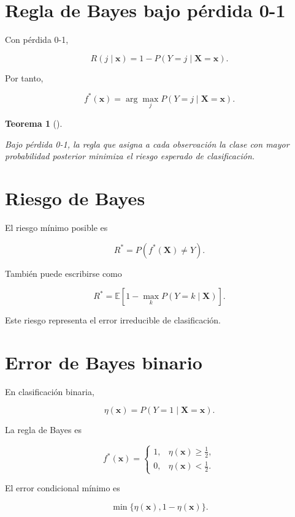 \documentclass[
  spanish,
  11pt,
  letterpaper,
  DIV=11,
  numbers=noendperiod]{scrreprt}
\theoremstyle{definition}
\theoremstyle{plain}
\newtheorem{theorem}{Teorema}[chapter]
\theoremstyle{definition}
\theoremstyle{remark}
\begin{document}
\section{Regla de Bayes bajo pérdida
0-1}\label{regla-de-bayes-bajo-puxe9rdida-0-1}

Con pérdida 0-1,

\[
R(j\mid\mathbf{x})
=
1-
P(Y=j\mid\mathbf{X}=\mathbf{x}).
\]

Por tanto,

\[
f^{*}(\mathbf{x})
=
\arg\max_j
P(Y=j\mid\mathbf{X}=\mathbf{x}).
\]

\begin{theorem}[]\protect\hypertarget{thm-regla-bayes}{}\label{thm-regla-bayes}

Bajo pérdida 0-1, la regla que asigna a cada observación la clase con
mayor probabilidad posterior minimiza el riesgo esperado de
clasificación.

\end{theorem}

\section{Riesgo de Bayes}\label{riesgo-de-bayes-1}

El riesgo mínimo posible es

\[
R^{*}
=
P(
f^{*}(\mathbf{X})\neq Y
).
\]

También puede escribirse como

\[
R^{*}
=
\mathbb{E}
\left[
1-
\max_k
P(Y=k\mid\mathbf{X})
\right].
\]

Este riesgo representa el error irreducible de clasificación.

\section{Error de Bayes binario}\label{error-de-bayes-binario}

En clasificación binaria,

\[
\eta(\mathbf{x})
=
P(Y=1\mid\mathbf{X}=\mathbf{x}).
\]

La regla de Bayes es

\[
f^{*}(\mathbf{x})
=
\begin{cases}
1, & \eta(\mathbf{x})\geq \frac{1}{2},\\
0, & \eta(\mathbf{x})<\frac{1}{2}.
\end{cases}
\]

El error condicional mínimo es

\[
\min
\{
\eta(\mathbf{x}),
1-\eta(\mathbf{x})
\}.
\]
\end{document}
